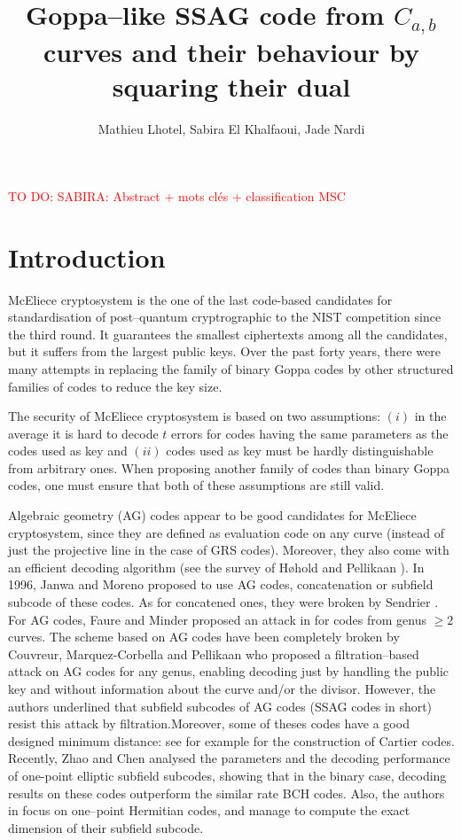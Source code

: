 \documentclass[a4paper]{article}
\title{Goppa--like SSAG code from $C_{a,b}$ curves and their behaviour by squaring their dual}
\author{Mathieu Lhotel, Sabira El Khalfaoui, Jade Nardi}
\date{}
\theoremstyle{definition}
\theoremstyle{remark}
\newcommand\TODO[1]{\textcolor{red}{TO DO: #1}}
\begin{document}
\parindent=0pt %

\maketitle

\TODO{SABIRA: Abstract + mots clés + classification MSC}

\section{Introduction}

McEliece cryptosystem is the one of the last code-based candidates for standardisation of post--quantum cryptrographic to the NIST competition since the third round. It guarantees the smallest ciphertexts among all the candidates, but it suffers from the largest public keys. Over the past forty years, there were many attempts in replacing the family of binary Goppa codes by other structured families of codes to reduce the key size.

The security of McEliece cryptosystem is based on two assumptions: $(i)$ in the average it is hard to decode $t$ errors for codes having the same parameters as the codes used as key and $(ii)$ codes used as key must be hardly distinguishable from arbitrary ones. When proposing another family of codes than binary Goppa codes, one must ensure that both of these assumptions are still valid.

 Algebraic geometry (AG) codes appear to be good candidates for McEliece cryptosystem, since they are defined as evaluation code on any curve (instead of just the projective line in the case of GRS codes). Moreover, they also come with an efficient decoding algorithm (see the survey of Høhold and Pellikaan \cite{HP95}).
In 1996, Janwa and Moreno \cite{JM96} proposed to use AG codes, concatenation or subfield subcode of these codes. As for concatened ones, they were broken by Sendrier \cite{Sen94}. For AG codes, Faure and Minder proposed an attack in \cite{FM08,Min07,Fau09} for codes from genus $\geq 2$ curves. The scheme based on AG codes have been completely broken by Couvreur, Marquez-Corbella and Pellikaan \cite{CMR17} who proposed a filtration--based attack on AG codes for any genus, enabling decoding just by handling the public key and without information about the curve and/or the divisor. However, the authors underlined that subfield subcodes of AG codes (SSAG codes in short) resist this attack by filtration.Moreover, some of theses codes have a good designed minimum distance: see for example \cite{Cou14} for the construction of Cartier codes. Recently, Zhao and Chen \cite{ZC22} analysed the parameters and the decoding performance of one-point elliptic subfield subcodes, showing that in the binary case, decoding results on these codes outperform the similar rate BCH codes. Also, the authors in \cite{PJ14,EKN21} focus on one--point Hermitian codes, and manage to compute the exact dimension of their subfield subcode. 
\end{document}

